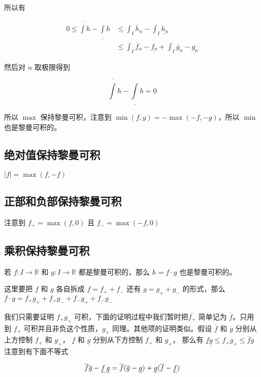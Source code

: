 所以有

\begin{align*}
0 \le \overline{\int}h - \underline{\int}h & \le \int_{I}\overline{h}_n - \int_{I}\underline{h_n} \\
& \le \int_{I} \overline{f}_n -\underline{f_n} + \int_{I} \overline{g}_n -\underline{g_n}
\end{align*}

然后对 $n$ 取极限得到 

\[
\overline{\int}h - \underline{\int}h = 0
\]

所以 $\max$ 保持黎曼可积，注意到 $\min(f,g) = - \max(-f,-g)$，所以 $\min$ 也是黎曼可积的。

\subsection{绝对值保持黎曼可积}

$\lvert f \rvert = \max(f, -f)$

\subsection{正部和负部保持黎曼可积}

注意到 $f_{+} = \max(f,0)$ 且 $f_{-} = \max(-f,0)$

\subsection{乘积保持黎曼可积}

若 $f: I \to \mathbb{R}$ 和 $g: I \to \mathbb{R}$ 都是黎曼可积的，那么 $h = f \cdot g$ 也是黎曼可积的。

这里要把 $f$ 和 $g$ 各自拆成 $f = f_{+} + f_{-}$ 还有 $g = g_{+} + g_{-}$ 的形式，那么  $f \cdot g = f_{+}g_{+} + f_{+}g_{-} + f_{-}g_{+} +f_{-}g_{-} $

我们只需要证明 $f_{+}g_{+}$ 可积，下面的证明过程中我们暂时把$\overline{f_{+}}$ 简单记为 $\overline{f}$。只用到 $f_{+}$ 可积并且非负这个性质，$g_{+}$ 同理。其他项的证明类似。假设 $\overline{f}$ 和 $\overline{g}$ 分别从上方控制 $f_{+}$ 和 $g_{+}$， 
$\underline{f}$ 和 $\underline{g}$ 分别从下方控制 $f_{+}$ 和 $g_{+}$，
那么有 $ \underline{f} \underline{g} \le f_{+}g_{+} \le \overline{f} \overline{g}$ 注意到有下面不等式

\[
    \overline{f}\overline{g} - \underline{f} \, \underline{g} =  \overline{f}(\overline{g} - \underline{g}) + \underline{g}(\overline{f} - \underline{f}) \\
\]


